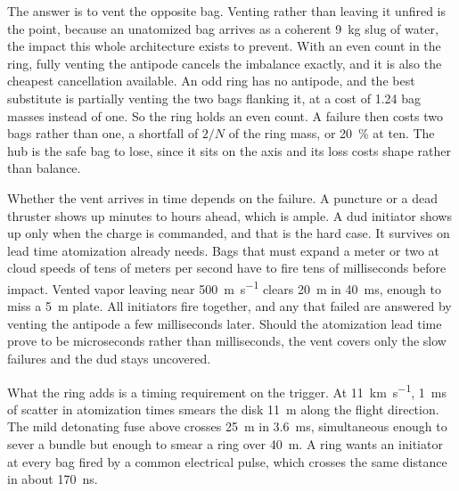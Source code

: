 \documentclass{article}
\begin{document}
The answer is to vent the opposite bag. Venting rather than leaving it unfired is the point, because an unatomized bag arrives as a coherent \SI{9}{\kilo\gram} slug of water, the impact this whole architecture exists to prevent. With an even count in the ring, fully venting the antipode cancels the imbalance exactly, and it is also the cheapest cancellation available. An odd ring has no antipode, and the best substitute is partially venting the two bags flanking it, at a cost of \num{1.24} bag masses instead of one. So the ring holds an even count. A failure then costs two bags rather than one, a shortfall of $2/N$ of the ring mass, or \SI{20}{\percent} at ten. The hub is the safe bag to lose, since it sits on the axis and its loss costs shape rather than balance.

Whether the vent arrives in time depends on the failure. A puncture or a dead thruster shows up minutes to hours ahead, which is ample. A dud initiator shows up only when the charge is commanded, and that is the hard case. It survives on lead time atomization already needs. Bags that must expand a meter or two at cloud speeds of tens of meters per second have to fire tens of milliseconds before impact. Vented vapor leaving near \SI{500}{\meter\per\second} clears \SI{20}{\meter} in \SI{40}{\milli\second}, enough to miss a \SI{5}{\meter} plate. All initiators fire together, and any that failed are answered by venting the antipode a few milliseconds later. Should the atomization lead time prove to be microseconds rather than milliseconds, the vent covers only the slow failures and the dud stays uncovered.

What the ring adds is a timing requirement on the trigger. At \SI{11}{\kilo\meter\per\second}, \SI{1}{\milli\second} of scatter in atomization times smears the disk \SI{11}{\meter} along the flight direction. The mild detonating fuse above crosses \SI{25}{\meter} in \SI{3.6}{\milli\second}, simultaneous enough to sever a bundle but enough to smear a ring over \SI{40}{\meter}. A ring wants an initiator at every bag fired by a common electrical pulse, which crosses the same distance in about \SI{170}{\nano\second}.
\end{document}

